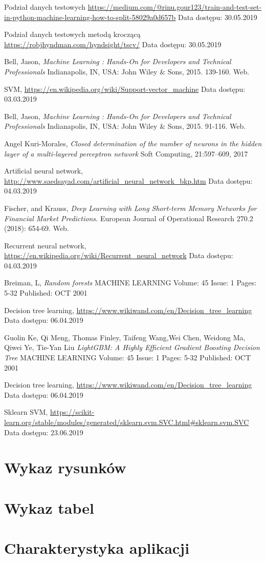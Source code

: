 \documentclass[a4paper, twoside, 11pt, openright]{article}
\begin{document}
\begin{thebibliography}{9}
 Podział danych testowych \url{https://medium.com/@rinu.gour123/train-and-test-set-in-python-machine-learning-how-to-split-58029a0d657b}
 Data dostępu: 30.05.2019
 
 
 Podział danych testowych metodą kroczącą \url{https://robjhyndman.com/hyndsight/tscv/}
 Data dostępu: 30.05.2019
 
	Bell, Jason, \textit{Machine Learning : Hands-On for Developers and Technical Professionals}  Indianapolis, IN, USA: John Wiley \& Sons, 2015. 139-160. Web.
	
	SVM, \url{https://en.wikipedia.org/wiki/Support-vector_machine} 
	Data dostępu: 03.03.2019

	Bell, Jason, \textit{Machine Learning : Hands-On for Developers and Technical Professionals}  Indianapolis, IN, USA: John Wiley \& Sons, 2015. 91-116. Web.


	Angel Kuri-Morales, 
  \textit{Closed determination of the number of neurons in the hidden layer of a multi-layered perceptron network}
  Soft Computing, 21:597–609, 2017

	Artificial neural network, \url{http://www.saedsayad.com/artificial_neural_network_bkp.htm} 
	Data dostępu: 04.03.2019

	Fischer, and Krauss, 
  \textit{Deep Learning with Long Short-term Memory Networks for Financial Market Predictions.}
  European Journal of Operational Research 270.2 (2018): 654-69. Web.

	Recurrent neural network, \url{https://en.wikipedia.org/wiki/Recurrent_neural_network} 
	Data dostępu: 04.03.2019

	Breiman, L, 
  \textit{Random forests}
	MACHINE LEARNING  Volume: 45   Issue: 1   Pages: 5-32   Published: OCT 2001


	Decision tree learning, \url{https://www.wikiwand.com/en/Decision_tree_learning} 
	Data dostępu: 06.04.2019


Guolin Ke, Qi Meng, Thomas Finley, Taifeng Wang,Wei Chen, Weidong Ma, Qiwei Ye, Tie-Yan Liu
  \textit{LightGBM: A Highly Efficient Gradient Boosting Decision Tree}
	MACHINE LEARNING  Volume: 45   Issue: 1   Pages: 5-32   Published: OCT 2001

	Decision tree learning, \url{https://www.wikiwand.com/en/Decision_tree_learning} 
	Data dostępu: 06.04.2019

	Sklearn SVM, \url{https://scikit-learn.org/stable/modules/generated/sklearn.svm.SVC.html#sklearn.svm.SVC}
	Data dostępu: 23.06.2019


\end{thebibliography}

\section{Wykaz rysunków}

\section{Wykaz tabel}

\section{Charakterystyka aplikacji}
\end{document}
